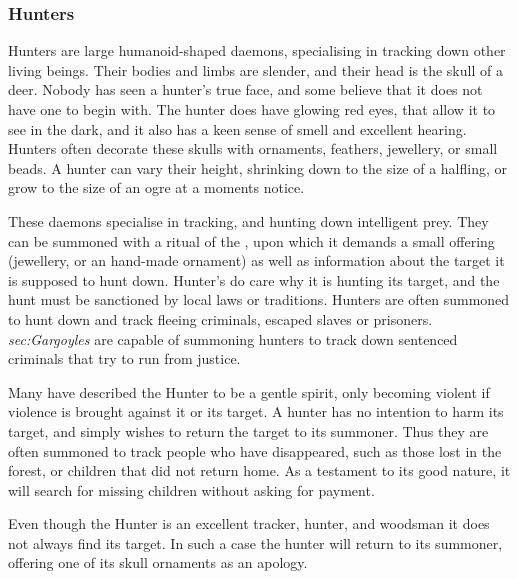 \subsubsection{Hunters}
\label{sec:Hunters}

Hunters are large humanoid-shaped daemons, specialising in tracking down
other living beings. Their bodies and limbs are slender, and their head is the
skull of a deer. Nobody has seen a hunter's true face, and some believe that
it does not have one to begin with. The hunter does have glowing red eyes,
that allow it to see in the dark, and it also has a keen sense of smell and
excellent hearing. Hunters often decorate these skulls with ornaments,
feathers, jewellery, or small beads. A hunter can vary their height, shrinking
down to the size of a halfling, or grow to the size of an ogre at a moments
notice.

These daemons specialise in tracking, and hunting down intelligent prey. They
can be summoned with a ritual of the , upon which it
demands a small offering (jewellery, or an hand-made ornament) as well as
information about the target it is supposed to hunt down. Hunter's do care why
it is hunting its target, and the hunt must be sanctioned by local laws or
traditions. Hunters are often summoned to hunt down and track fleeing
criminals, escaped slaves or prisoners. \emph{sec:Gargoyles} are capable of
summoning hunters to track down sentenced criminals that try to run from
justice.

Many have described the Hunter to be a gentle spirit, only becoming violent if
violence is brought against it or its target. A hunter has no intention to
harm its target, and simply wishes to return the target to its summoner. Thus
they are often summoned to track people who have disappeared, such as those
lost in the forest, or children that did not return home. As a testament to
its good nature, it will search for missing children without asking for
payment.


Even though the Hunter is an excellent tracker, hunter, and woodsman it does
not always find its target. In such a case the hunter will return to its
summoner, offering one of its skull ornaments as an apology.

